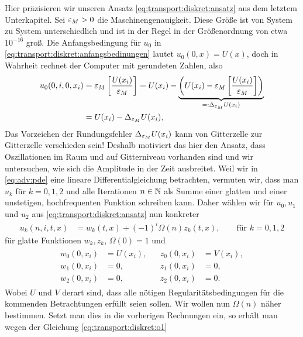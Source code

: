 
Hier präzisieren wir unseren Ansatz \eqref{eq:transport:diskret:ansatz} aus dem letztem Unterkapitel. %
Sei $\varepsilon_M > 0$ die Maschinengenauigkeit.
Diese Größe ist von System zu System unterschiedlich und ist in der Regel in der Größenordnung von etwa $10^{-16}$ groß.
Die Anfangsbedingung für $u_0$ in \eqref{eq:transport:diskret:anfangsbedinungen} lautet $u_0(0, x) = U(x)$, doch in Wahrheit rechnet der Computer mit gerundeten Zahlen, also
\begin{align*}
u_0(0, i, 0, x_i) &= \varepsilon_M \left[\frac{U(x_i)}{\varepsilon_M}\right] = U(x_i) - \underbrace{\left( U(x_i) - \varepsilon_M \left[\frac{U(x_i)}{\varepsilon_M}\right] \right)}_{=: \Delta_{\varepsilon_M} U(x_i)}\\
&= U(x_i) - \Delta_{\varepsilon_M} U(x_i),
\end{align*}
Das Vorzeichen der Rundungsfehler $\Delta_{\varepsilon_M} U(x_i)$ kann von Gitterzelle zur Gitterzelle verschieden sein!
Deshalb motiviert das hier den Ansatz, dass Oszillationen im Raum und auf Gitterniveau vorhanden sind und wir untersuchen, wie sich die Amplitude in der Zeit ausbreitet.
Weil wir in \eqref{eq:adv:pde} eine lineare Differentialgleichung betrachten, vermuten wir, dass man $u_k$ für $k = 0,1,2$ und alle Iterationen $n \in \mathbb N$ als Summe einer glatten und einer unstetigen, hochfrequenten Funktion schreiben kann.
Daher wählen wir für $u_0, u_1$ und $u_2$ aus \eqref{eq:transport:diskret:ansatz} nun konkreter 
\begin{align}\label{eq:transport:osz:ansatz1}
u_k(n, i, t, x) &= w_k(t, x) + (-1)^i \Omega(n) z_k(t, x), \qquad \text{für $k = 0,1,2$}
\end{align}
für glatte Funktionen $w_k, z_k$, $\Omega(0) = 1$ und
\begin{align}\label{eq:transport:osz:anfangsbedinungen}
\begin{split}
w_0(0, x_i) &= U(x_i),\\
w_1(0, x_i) &= 0,\\
w_2(0, x_i) &= 0,
\end{split}&
\begin{split}
z_0(0, x_i) &= V(x_i),\\
z_1(0, x_i) &= 0,\\
z_2(0, x_i) &= 0.
\end{split}
\end{align}
Wobei $U$ und $V$ derart sind, dass alle nötigen Regularitätsbedingungen für die kommenden Betrachtungen erfüllt seien sollen.
Wir wollen nun $\Omega(n)$ näher bestimmen.
Setzt man dies in die vorherigen Rechnungen ein, so erhält man wegen der Gleichung \eqref{eq:transport:diskret:o1}

